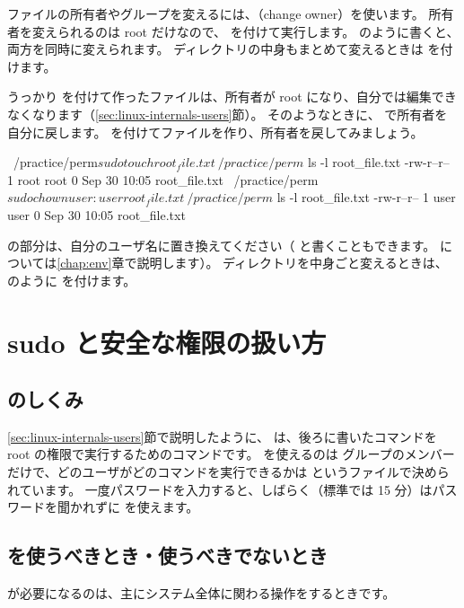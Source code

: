ファイルの所有者やグループを変えるには、（change owner）を使います。
所有者を変えられるのは root だけなので、 を付けて実行します。
 のように書くと、両方を同時に変えられます。
ディレクトリの中身もまとめて変えるときは  を付けます。

うっかり  を付けて作ったファイルは、所有者が root になり、自分では編集できなくなります（\ref{sec:linux-internals-users}節）。
そのようなときに、 で所有者を自分に戻します。
 を付けてファイルを作り、所有者を戻してみましょう。

\begin{terminal}[所有者を変える]
~/practice/perm$ sudo touch root_file.txt
~/practice/perm$ ls -l root_file.txt
-rw-r--r-- 1 root root 0 Sep 30 10:05 root_file.txt
~/practice/perm$ sudo chown user:user root_file.txt
~/practice/perm$ ls -l root_file.txt
-rw-r--r-- 1 user user 0 Sep 30 10:05 root_file.txt
\end{terminal}

 の部分は、自分のユーザ名に置き換えてください（ と書くこともできます。 については\ref{chap:env}章で説明します）。
ディレクトリを中身ごと変えるときは、 のように  を付けます。

\section{sudo と安全な権限の扱い方}
\label{sec:permission-sudo}

\subsection{ のしくみ}

\ref{sec:linux-internals-users}節で説明したように、 は、後ろに書いたコマンドを root の権限で実行するためのコマンドです。
 を使えるのは  グループのメンバーだけで、どのユーザがどのコマンドを実行できるかは  というファイルで決められています。
一度パスワードを入力すると、しばらく（標準では 15 分）はパスワードを聞かれずに  を使えます。

\subsection{ を使うべきとき・使うべきでないとき}

 が必要になるのは、主にシステム全体に関わる操作をするときです。


